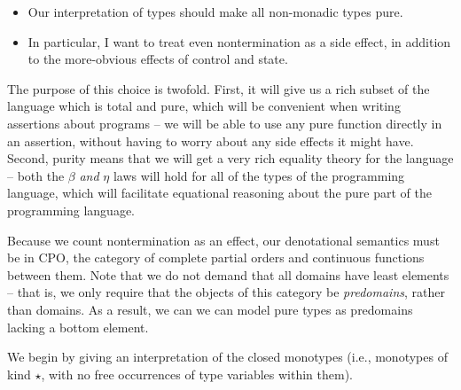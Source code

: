 \documentclass[12pt]{article}
\begin{document}
\begin{itemize}
\item Our interpretation of types should make all non-monadic types 
  pure. 
\item In particular, I want to treat even nontermination as a side
  effect, in addition to the more-obvious effects of control and state. 
\end{itemize}

The purpose of this choice is twofold. First, it will give us a rich
subset of the language which is total and pure, which will be convenient
when writing assertions about programs -- we will be able to use any pure 
function directly in an assertion, without having to worry about any 
side effects it might have. Second, purity means that we will get a 
very rich equality theory for the language -- both the $\beta$ \emph{and}
$\eta$ laws will hold for all of the types of the programming language,
which will facilitate equational reasoning about the pure part of the 
programming language. 

Because we count nontermination as an effect, our denotational
semantics must be in CPO, the category of complete partial orders and
continuous functions between them. Note that we do not demand that all
domains have least elements -- that is, we only require that the
objects of this category be \emph{predomains}, rather than domains. As
a result, we can we can model pure types as predomains lacking a
bottom element.

We begin by giving an interpretation of the closed monotypes (i.e.,
monotypes of kind $\star$, with no free occurrences of type variables
within them).  
\end{document}
